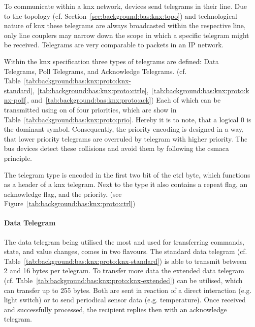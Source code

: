 To communicate within a \gls{knx} network, devices send telegrams in their line. Due to the topology (cf. Section~\ref{sec:background:bas:knx:topo}) and technological nature of \gls{knx} these telegrams are always broadcasted within the respective line, only line couplers may narrow down the scope in which a specific telegram might be received. Telegrams are very comparable to packets in an IP network.

Within the \gls{knx} specification three types of telegrams are defined: Data Telegrams, Poll Telegrams, and Acknowledge Telegrams. (cf. Table~\ref{tab:background:bas:knx:proto:knx-standard},~\ref{tab:background:bas:knx:proto:ctrle},~\ref{tab:background:bas:knx:proto:knx-poll}, and~\ref{tab:background:bas:knx:proto:ack})
Each of which can be transmitted using on of four priorities, which are show in Table~\ref{tab:background:bas:knx:proto:prio}. Hereby it is to note, that a logical 0 is the dominant symbol. Consequently, the priority encoding is designed in a way, that lower priority telegrams are overruled by telegram with higher priority.
The bus devices detect these collisions and avoid them by following the \gls{csmaca} principle.

The telegram type is encoded in the first two bit of the \gls{ctrl} byte, which functions as a header of a \gls{knx} telegram. Next to the type it also contains a repeat flag, an acknowledge flag, and the priority. (see Figure~\ref{tab:background:bas:knx:proto:ctrl})



\paragraph{Data Telegram}
\label{sec:background:bas:knx:proto:data}

The data telegram being utilised the most and used for transferring commands, state, and value changes, comes in two flavours.
The standard data telegram (cf. Table~\ref{tab:background:bas:knx:proto:knx-standard}) is able to transmit between 2 and 16 bytes per telegram. To transfer more data the extended data telegram (cf. Table~\ref{tab:background:bas:knx:proto:knx-extended}) can be utilised, which can transfer up to 255 bytes.
Both are sent in reaction of a direct interaction (e.g. light switch) or to send periodical sensor data (e.g. temperature). \parencite{Merz2009}
Once received and successfully processed, the recipient replies then with an acknowledge telegram. \parencite{Merz2009,Sokollik2017}

